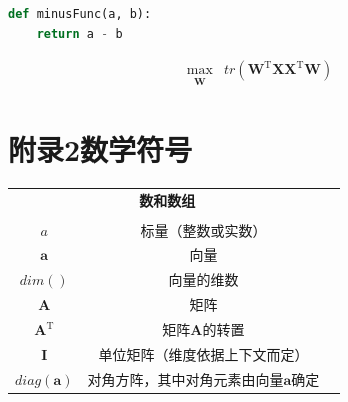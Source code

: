 \documentclass[a4paper,AutoFakeBold,oneside,12pt]{book}
\begin{document}
\begin{lstlisting}[language=Python, caption=减法, label=minus, tabsize=2]  
def minusFunc(a, b):
	return a - b 
\end{lstlisting}  

\begin{equation}
\label{PCA_goal}
\begin{aligned}
\max_{\substack{\bm{W}}}  &  tr(\bm{W}^\mathrm{T}\bm{X}\bm{X}^ \mathrm{T}\bm{W})
\end{aligned}
\end{equation}

\clearpage
{}
{}
\section*{附录2\quad{}数学符号}
\begin{center}
	\begin{tabular}{ccc}
		\multicolumn{2}{c}{\textbf{数和数组}} \\
		\\
		$a$ & 标量（整数或实数）\\
		$\bm{a}$ & 向量\\
		$dim()$ & 向量的维数\\
		$\bm{A}$ & 矩阵\\
		$\bm{A}^\mathrm{T}$ & 矩阵$\textbf{A}$的转置\\
		$\bm{I}$ & 单位矩阵（维度依据上下文而定） \\
 		$diag(\bm{a})$ & 对角方阵，其中对角元素由向量$\bm{a}$确定 \\

	\end{tabular}
\end{center}

\newpage\backmatter

\blankmatter
\thispagestyle{empty}
\begin{center}


\end{center}

\setcounter{chapter}{0}
\renewcommand{\thefigure}{~外\arabic{chapter}-\arabic{figure}~}
\renewcommand{\theequation}{~外\arabic{chapter}-\arabic{equation}~}
\renewcommand{\thetable}{~外\arabic{chapter}-\arabic{table}~}
\end{document}
